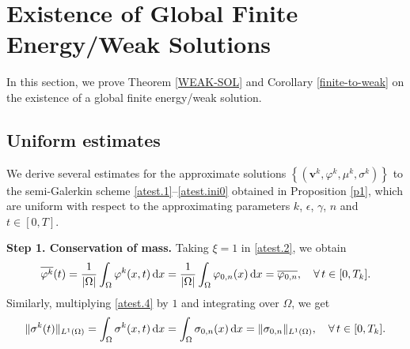 \documentclass[11pt,reqno]{amsart}
\def\d{{\rm d}}
\begin{document}
\section{Existence of Global Finite Energy/Weak Solutions}
\label{EXIST-WEAK}
\setcounter{equation}{0}

In this section, we prove Theorem \ref{WEAK-SOL} and Corollary \ref{finite-to-weak} on the existence of a global finite energy/weak solution.


\subsection{Uniform estimates}\label{ue}
%
We derive several estimates for the approximate solutions $\left\{ (\bm{v}^k,\varphi^k, \mu^k,\sigma^k) \right\}$ to the semi-Galerkin scheme \eqref{atest.1}--\eqref{atest.ini0} obtained in Proposition \ref{p1}, which are uniform with respect to the approximating parameters $k$, $\epsilon$, $\gamma$, $n$ and $t\in [0,T]$.
\medskip

\textbf{Step 1. Conservation of mass.} Taking $\xi=1$ in \eqref{atest.2}, we obtain
\begin{equation}
\label{cons-mass1}
\overline{\varphi^k}(t)= \frac{1}{|\Omega|} \int_{\Omega} \varphi^k(x,t) \, \d x= \frac{1}{|\Omega|} \int_{\Omega} \varphi_{0,n}(x) \, \d x=\overline{\varphi_{0,n}}, \quad \forall \, t \in [0,T_k].
\end{equation}
%
Similarly, multiplying \eqref{atest.4} by $1$ and integrating over $\Omega$, we get
%
\begin{equation}
\label{cons-mass2}
\| \sigma^k(t)\|_{L^1(\Omega)}= \int_{\Omega} \sigma^k(x,t) \, \d x=  \int_{\Omega} \sigma_{0,n}(x) \, \d x =\| \sigma_{0,n}\|_{L^1(\Omega)}, \quad \forall \, t \in [0,T_k].
\end{equation}
\end{document}

